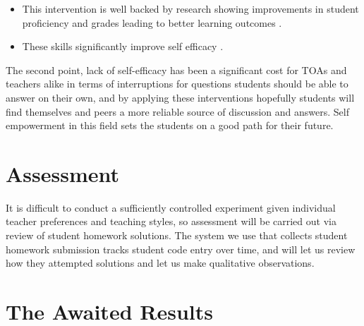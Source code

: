 \documentclass[paper=a4,]{tufte-handout}
\providecommand{\tightlist}{%
  \setlength{\itemsep}{0pt}\setlength{\parskip}{0pt}}
\begin{document}
\begin{itemize}
\tightlist
\item
  This intervention is well backed by research showing improvements in
  student proficiency and grades \citep{Hertz_2013,Renkl_2002}
  leading to better learning outcomes \citep{Renkl_2004}.
\item
  These skills significantly improve self efficacy
		\citep{Ramalingam_2004,Michaeli_2019}.
\end{itemize}

The second point, lack of self-efficacy has been a significant cost for
TOAs and teachers alike in terms of interruptions for questions students
should be able to answer on their own, and by applying these
interventions hopefully students will find themselves and peers a more
reliable source of discussion and answers. Self empowerment in this
field sets the students on a good path for their future.

\hypertarget{assessment}{%
\section{Assessment}\label{assessment}}

It is difficult to conduct a sufficiently controlled experiment given
individual teacher preferences and teaching styles, so assessment will
be carried out via review of student homework solutions. The system we
use that collects student homework submission tracks student code entry
over time, and will let us review how they attempted solutions and let
us make qualitative observations.

\hypertarget{the-awaited-results}{%
\section{The Awaited Results}\label{the-awaited-results}}
\end{document}
